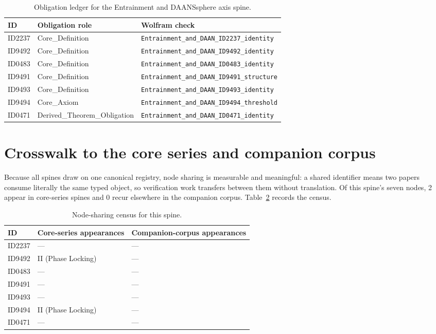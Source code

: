 \documentclass[11pt]{article}
\theoremstyle{remark}
\begin{document}
\begin{table}[ht]
\centering
\small
\caption{Obligation ledger for the Entrainment and DAANSsphere axis spine.}
\label{tab:obligations}
\begin{tabular}{llp{6.2cm}}
\toprule
ID & Obligation role & Wolfram check \\
\midrule
ID2237 & Core\_Definition & \texttt{Entrainment\_and\_DAAN\_ID2237\_identity} \\
ID9492 & Core\_Definition & \texttt{Entrainment\_and\_DAAN\_ID9492\_identity} \\
ID0483 & Core\_Definition & \texttt{Entrainment\_and\_DAAN\_ID0483\_identity} \\
ID9491 & Core\_Definition & \texttt{Entrainment\_and\_DAAN\_ID9491\_structure} \\
ID9493 & Core\_Definition & \texttt{Entrainment\_and\_DAAN\_ID9493\_identity} \\
ID9494 & Core\_Axiom & \texttt{Entrainment\_and\_DAAN\_ID9494\_threshold} \\
ID0471 & Derived\_Theorem\_Obligation & \texttt{Entrainment\_and\_DAAN\_ID0471\_identity} \\
\bottomrule
\end{tabular}
\end{table}

\section{Crosswalk to the core series and companion corpus}
\label{sec:crosswalk}

Because all spines draw on one canonical registry, node sharing is measurable and meaningful: a shared identifier means two papers consume literally the same typed object, so verification work transfers between them without translation. Of this spine's seven nodes, 2 appear in core-series spines and 0 recur elsewhere in the companion corpus. Table~\ref{tab:crosswalk} records the census.

\begin{table}[ht]
\centering
\small
\caption{Node-sharing census for this spine.}
\label{tab:crosswalk}
\begin{tabular}{lp{4.4cm}p{6.6cm}}
\toprule
ID & Core-series appearances & Companion-corpus appearances \\
\midrule
ID2237 & --- & --- \\
ID9492 & II (Phase Locking) & --- \\
ID0483 & --- & --- \\
ID9491 & --- & --- \\
ID9493 & --- & --- \\
ID9494 & II (Phase Locking) & --- \\
ID0471 & --- & --- \\
\bottomrule
\end{tabular}
\end{table}
\end{document}
